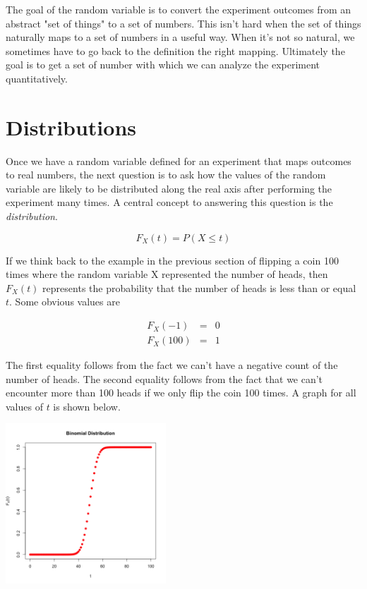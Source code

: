 \documentclass[]{article}
\begin{document}
The goal of the random variable is to convert the experiment
outcomes from an abstract "set of things" to a set of numbers.
This isn't hard when the set of things naturally maps to a set
of numbers in a useful way.  When it's not so natural, we
sometimes have to go back to the definition the right mapping.
Ultimately the goal is to get a set of number with which we
can analyze the experiment quantitatively.

\section{Distributions}

Once we have a random variable defined for an experiment that
maps outcomes to real numbers, the next question is to ask
how the values of the random variable are likely to be
distributed along the real axis after performing the
experiment many times.  A central concept to answering
this question is the \emph{distribution}.

$$
F_X(t) = P(X \le t)
$$

If we think back to the example in the previous section
of flipping a coin 100 times where the random variable X
represented the number of heads, then $F_X(t)$ represents
the probability that the number of heads is less than or
equal $t$.  Some obvious values are

\begin{eqnarray*}
F_X(-1) & = & 0\\
F_X(100) & = & 1
\end{eqnarray*}

The first equality follows from the fact we can't have a
negative count of the number of heads.  The second
equality follows from the fact that we can't encounter
more than 100 heads if we only flip the coin 100 times.
A graph for all values of $t$ is shown below.

  \includegraphics[height=6cm,keepaspectratio]{cdf1.png}
\end{document}
